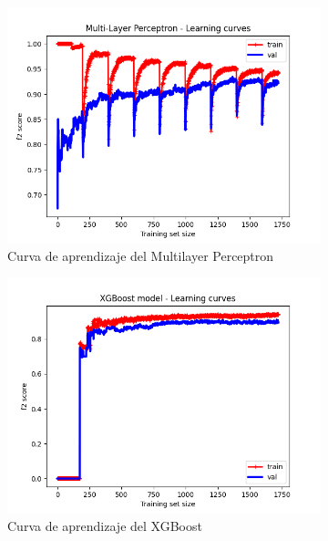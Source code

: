 \begin{figure}[!ht]
    \centering
    \begin{subfigure}[b]{0.3\textwidth}
        \includegraphics[width=\linewidth]{media/images/learning-curves/mlp.png}
        \caption{Curva de aprendizaje del Multilayer Perceptron}
        \label{sfig:lc-mlp}
    \end{subfigure}
    \begin{subfigure}[b]{0.3\textwidth}
        \includegraphics[width=\linewidth]{media/images/learning-curves/xgb.png}
        \caption{Curva de aprendizaje del XGBoost}
        \label{sfig:lc-xgb}
    \end{subfigure}
    \begin{subfigure}[b]{0.3\textwidth}

\end{subfigure}
\end{figure}

